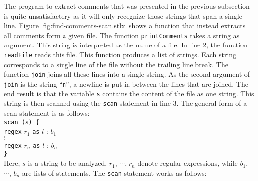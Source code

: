 \noindent 
The program to extract comments that was presented in the previous subsection is quite
unsatisfactory as it will only recognize those strings that span a single line.
Figure \ref{fig:find-comments-scan.stlx} shows a function that instead extracts all
comments form a given file.  The function \texttt{printComments} takes a string as
argument.  This string is interpreted as the name of a file.  In line 2, the function 
\texttt{readFile} reads this file.  This function produces a list of strings.  Each string
corresponds to a single line of the file without the trailing line break.  The function
\texttt{join} joins all these lines into a single string.  As the second argument of
\texttt{join} is the string ``\texttt{n}'', a newline is put in between the
lines that are joined.  The end result is that the variable \texttt{s} contains the
content of the file as one string.  This string is then scanned using the \texttt{scan}
statement in line 3. The general form of a scan statement is as follows:
\\[0.2cm]
\hspace*{1.3cm} \texttt{scan ($s$) \{}  \\
\hspace*{1.8cm} \texttt{regex} $r_1$ \texttt{as} $l$ : $b_1$ \\
\hspace*{1.8cm} $\vdots$                                                  \\
\hspace*{1.8cm} \texttt{regex} $r_n$ \texttt{as} $l$ : $b_n$ \\
\hspace*{1.3cm} \texttt{\}}             
\\[0.2cm]
Here, $s$ is a string to be analyzed, $r_1$, $\cdots$, $r_n$ denote regular
expressions, while $b_1$, $\cdots$, $b_n$ are lists of statements.  The \texttt{scan}
statement works as follows:
